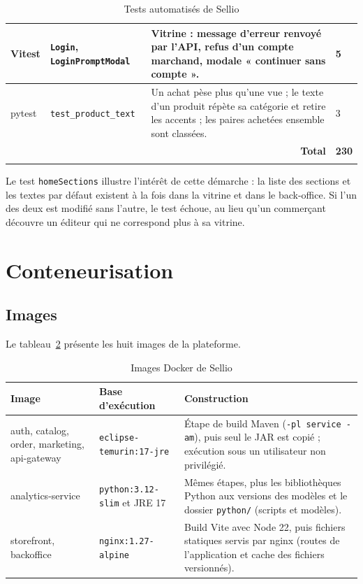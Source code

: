 \begin{longtable}{|p{2.4cm}|p{4.2cm}|p{7cm}|p{1.2cm}|}
\hline
Vitest & \texttt{Login}, \texttt{LoginPromptModal} & Vitrine : message d'erreur renvoyé par l'API, refus d'un compte marchand, modale « continuer sans compte ». & 5 \\
\hline
pytest & \texttt{test\_product\_text} & Un achat pèse plus qu'une vue ; le texte d'un produit répète sa catégorie et retire les accents ; les paires achetées ensemble sont classées. & 3 \\
\hline
\multicolumn{3}{|r|}{\textbf{Total}} & \textbf{230} \\
\hline
\caption{Tests automatisés de Sellio}
\label{tab:tests}
\end{longtable}

Le test \texttt{homeSections} illustre l'intérêt de cette démarche : la liste des sections et les textes par défaut existent à la fois dans la vitrine et dans le back-office. Si l'un des deux est modifié sans l'autre, le test échoue, au lieu qu'un commerçant découvre un éditeur qui ne correspond plus à sa vitrine.

\section{Conteneurisation}
\subsection{Images}
Le tableau~\ref{tab:images} présente les huit images de la plateforme.
\begin{table}[H]
\centering
\renewcommand{\arraystretch}{1.3}
\small
\begin{tabular}{|p{3.6cm}|p{4.4cm}|p{6.6cm}|}
\hline
\textbf{Image} & \textbf{Base d'exécution} & \textbf{Construction} \\
\hline
auth, catalog, order, marketing, api-gateway & \texttt{eclipse-temurin:17-jre} & Étape de build Maven (\texttt{-pl service -am}), puis seul le JAR est copié ; exécution sous un utilisateur non privilégié. \\
\hline
analytics-service & \texttt{python:3.12-slim} et JRE 17 & Mêmes étapes, plus les bibliothèques Python aux versions des modèles et le dossier \texttt{python/} (scripts et modèles). \\
\hline
storefront, backoffice & \texttt{nginx:1.27-alpine} & Build Vite avec Node 22, puis fichiers statiques servis par nginx (routes de l'application et cache des fichiers versionnés). \\
\hline
\end{tabular}
\caption{Images Docker de Sellio}
\label{tab:images}
\end{table}

